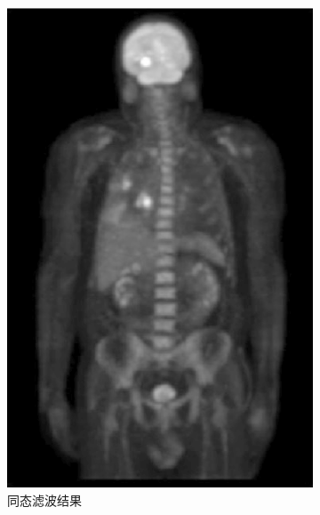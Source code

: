 \documentclass[a4paper]{ctexart}
\newcommand{\outwthree}{0.3\textwidth}
\begin{document}
\begin{spacing}{1.35}
\begin{figure}[htbp]
\begin{subfigure}[t]{\outwthree}
			\includegraphics[width=\textwidth]{figure/2homo.png}
			\caption{同态滤波结果}
		\end{subfigure}
		\begin{subfigure}[t]{\outwthree}
			\centering

\end{subfigure}
\end{figure}
\end{spacing}
\end{document}
